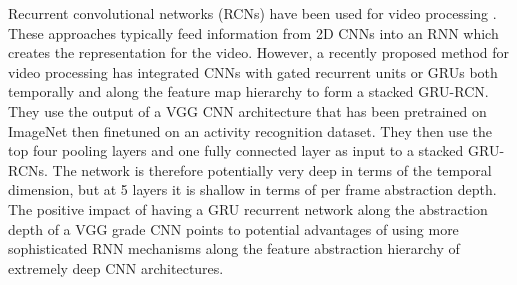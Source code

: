 \documentclass{article}
\begin{document}
Recurrent convolutional networks (RCNs) have been used for video processing \cite{srivastava2015unsupervised,donahue2014long}. These approaches typically feed information from 2D CNNs into an RNN which creates the representation for the video.
However, a recently proposed method for video processing \cite{ballas2015delving} has integrated CNNs with gated recurrent units or GRUs \cite{chung2014empirical} both temporally and along the feature map hierarchy to form a stacked GRU-RCN. They use the output of a VGG CNN architecture that has been pretrained on ImageNet \cite{simonyan2014very} then finetuned on an activity recognition dataset. They then use the top four pooling layers and one fully connected layer as input to a stacked GRU-RCNs. The network is therefore potentially very deep in terms of the temporal dimension, but at 5 layers it is shallow in terms of per frame abstraction depth. The positive impact of having a GRU recurrent network along the abstraction depth of a VGG grade CNN points to potential advantages of using more sophisticated RNN mechanisms along the feature abstraction hierarchy of extremely deep CNN architectures.
\end{document}
